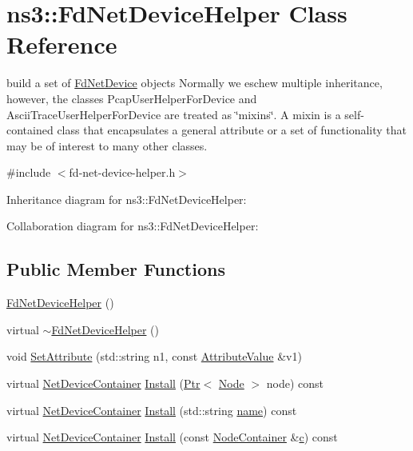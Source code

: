 \hypertarget{classns3_1_1FdNetDeviceHelper}{}\section{ns3\+:\+:Fd\+Net\+Device\+Helper Class Reference}
\label{classns3_1_1FdNetDeviceHelper}


build a set of \hyperlink{classns3_1_1FdNetDevice}{Fd\+Net\+Device} objects Normally we eschew multiple inheritance, however, the classes Pcap\+User\+Helper\+For\+Device and Ascii\+Trace\+User\+Helper\+For\+Device are treated as \char`\"{}mixins\char`\"{}. A mixin is a self-\/contained class that encapsulates a general attribute or a set of functionality that may be of interest to many other classes.  




{\ttfamily \#include $<$fd-\/net-\/device-\/helper.\+h$>$}



Inheritance diagram for ns3\+:\+:Fd\+Net\+Device\+Helper\+:


Collaboration diagram for ns3\+:\+:Fd\+Net\+Device\+Helper\+:
\subsection*{Public Member Functions}
\begin{DoxyCompactItemize}
\item 
\hyperlink{classns3_1_1FdNetDeviceHelper_a9aaeaa49939e9212ce16f11345e2e4eb}{Fd\+Net\+Device\+Helper} ()
\item 
virtual \hyperlink{classns3_1_1FdNetDeviceHelper_a8018d2553649901a9f37ccc9ef3385e2}{$\sim$\+Fd\+Net\+Device\+Helper} ()
\item 
void \hyperlink{classns3_1_1FdNetDeviceHelper_a0274f52a7b4288ca58f04fc2ac31d398}{Set\+Attribute} (std\+::string n1, const \hyperlink{classns3_1_1AttributeValue}{Attribute\+Value} \&v1)
\item 
virtual \hyperlink{classns3_1_1NetDeviceContainer}{Net\+Device\+Container} \hyperlink{classns3_1_1FdNetDeviceHelper_af70d55cbb4f6411c33cacb84eb651ad5}{Install} (\hyperlink{classns3_1_1Ptr}{Ptr}$<$ \hyperlink{classns3_1_1Node}{Node} $>$ node) const 
\item 
virtual \hyperlink{classns3_1_1NetDeviceContainer}{Net\+Device\+Container} \hyperlink{classns3_1_1FdNetDeviceHelper_ab7e70ab5e273b32a5cf3519674f1cc4e}{Install} (std\+::string \hyperlink{generate__test__data__lte__spectrum__model_8m_ab74e6bf80237ddc4109968cedc58c151}{name}) const 
\item 
virtual \hyperlink{classns3_1_1NetDeviceContainer}{Net\+Device\+Container} \hyperlink{classns3_1_1FdNetDeviceHelper_a9f9355b6beaa030c7fab05b3eb3b4952}{Install} (const \hyperlink{classns3_1_1NodeContainer}{Node\+Container} \&\hyperlink{mmwave_2model_2fading-traces_2fading__trace__generator_8m_ae0323a9039add2978bf5b49550572c7c}{c}) const 
\end{DoxyCompactItemize}
